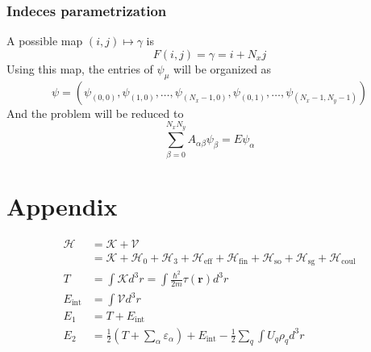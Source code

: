 \documentclass{article}
\begin{document}
\subsubsection{Indeces parametrization}
A possible map $(i, j) \mapsto \gamma$ is
\begin{equation}
F(i, j) = \gamma = i + N_x j \label{eq:indeces_parametrization}
    \end{equation}
Using this map, the entries of $\psi_\mu$ will be organized as 
\begin{equation}
\psi = (\psi_{(0, 0)}, \psi_{(1, 0)}, \ldots, \psi_{(N_x-1, 0)}, \psi_{(0, 1)}, \ldots, \psi_{(N_x-1, N_y-1)})
\end{equation}
And the problem will be reduced to 
\begin{equation}
\sum_{\beta=0}^{N_x N_y}A_{\alpha\beta}\psi_{\beta} = E\psi_\alpha
\end{equation}





%
\newpage




\newpage
\newpage
\section{Appendix}
\begin{align}
    \mathcal H &= \mathcal K + \mathcal V 
    \\&= \mathcal K + \mathcal H_0 + \mathcal H_3 + \mathcal H_\text{eff}+\mathcal H_\text{fin}+\mathcal H_\text{so} + \mathcal H_\text{sg} + \mathcal H_\text{coul}
    \\T &= \int \mathcal K d^3r= \int \frac{\hbar^2}{2m}\tau(\mathbf r) d^3r
    \\E_\text{int} &= \int \mathcal{V} d^3r
    \\E_1 &= T + E_\text{int}
    \\E_2 &= \frac 1 2 (T + \sum_\alpha \varepsilon_\alpha ) + E_\text{int} - \frac 1 2 \sum_q \int U_q  \rho_q d^3r
\end{align}
\end{document}
